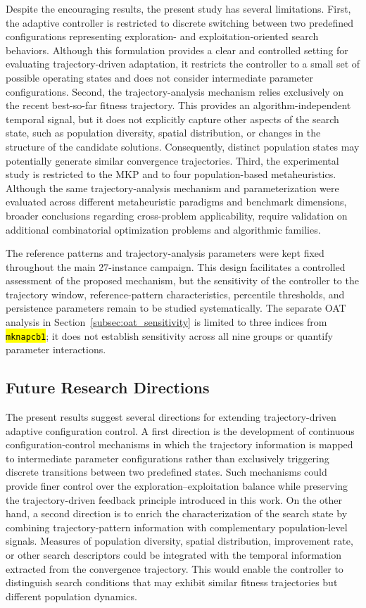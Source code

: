 \documentclass[mathematics,article,accept,moreauthors]{Definitions/mdpi}
\begin{document}
Despite the encouraging results, the present study has several limitations.
First, the adaptive controller is restricted to discrete switching between
two predefined configurations representing exploration- and
exploitation-oriented search behaviors. Although this formulation provides
a clear and controlled setting for evaluating trajectory-driven adaptation,
it restricts the controller to a small set of possible operating states and
does not consider intermediate parameter configurations. Second, the trajectory-analysis mechanism relies exclusively on the recent best-so-far fitness trajectory. This provides an algorithm-independent temporal signal, but it does not explicitly capture other aspects of the search state, such as population diversity, spatial distribution, or changes in the structure of the candidate solutions. Consequently, distinct population states may potentially generate similar convergence trajectories. Third, the experimental study is restricted to the MKP and to four population-based metaheuristics. Although the same trajectory-analysis mechanism and parameterization were evaluated across different
metaheuristic paradigms and benchmark dimensions, broader conclusions
regarding cross-problem applicability, require validation on additional
combinatorial optimization problems and algorithmic families.

The reference patterns and trajectory-analysis parameters were
kept fixed throughout the main 27-instance campaign. This design facilitates a
controlled assessment of the proposed mechanism, but the sensitivity of the
controller to the trajectory window, reference-pattern characteristics,
percentile thresholds, and persistence parameters remain to be studied
systematically. The separate OAT analysis in
Section~\ref{subsec:oat_sensitivity} is limited to three indices from
\texttt{\hl{mknapcb1}}; it does not establish sensitivity across all nine
groups or quantify parameter interactions.


\subsection{Future Research Directions}
\label{subsec:future_work}

The present results suggest several directions for extending
trajectory-driven adaptive configuration control. A first direction is the
development of continuous configuration-control mechanisms in which the
trajectory information is mapped to intermediate parameter configurations
rather than exclusively triggering discrete transitions between two
predefined states. Such mechanisms could provide finer control over the
exploration--exploitation balance while preserving the trajectory-driven
feedback principle introduced in this work. On the other hand, a second direction is to enrich the characterization of the search state by combining trajectory-pattern information with complementary population-level signals. Measures of population diversity, spatial distribution, improvement rate, or other search descriptors could be integrated with the temporal information extracted from the convergence trajectory. This would enable the controller to distinguish search conditions that may exhibit similar fitness trajectories but different population dynamics.
\end{document}
